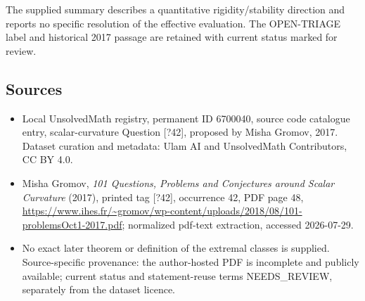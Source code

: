 \documentclass[11pt]{article}
\begin{document}
The supplied summary describes a quantitative rigidity/stability direction and reports no specific resolution of the effective evaluation. The OPEN-TRIAGE label and historical 2017 passage are retained with current status marked for review.
\subsection{Sources}
\begin{itemize}
\item Local UnsolvedMath registry, permanent ID 6700040, source code catalogue entry, scalar-curvature Question [?42], proposed by Misha Gromov, 2017. Dataset curation and metadata: Ulam AI and UnsolvedMath Contributors, CC BY 4.0.
\item Misha Gromov, \emph{101 Questions, Problems and Conjectures around Scalar Curvature} (2017), printed tag [?42], occurrence 42, PDF page 48, \url{https://www.ihes.fr/~gromov/wp-content/uploads/2018/08/101-problemsOct1-2017.pdf}; normalized pdf-text extraction, accessed 2026-07-29.
\item No exact later theorem or definition of the extremal classes is supplied. Source-specific provenance: the author-hosted PDF is incomplete and publicly available; current status and statement-reuse terms NEEDS\_REVIEW, separately from the dataset licence.
\end{itemize}
\end{document}

